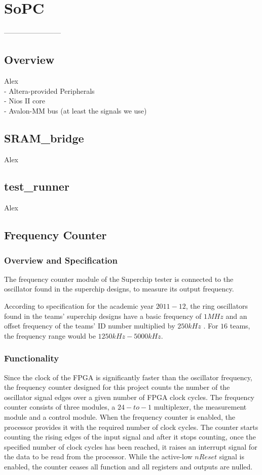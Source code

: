 \chapter{SoPC}
------------------------

\section{Overview}
Alex \\
   - Altera-provided Peripherals \\
   - Nios II core \\
   - Avalon-MM bus (at least the signals we use)

\section{SRAM\_bridge}
Alex

\section{test\_runner}
Alex \\


\section{Frequency Counter}

\subsection{Overview and Specification}

The frequency counter module of the Superchip tester is connected to the oscillator found in the superchip designs, to measure its output frequency.

According to specification for the academic year $2011-12$, the ring oscillators found in the teams' superchip designs have a basic frequency of $1MHz$ and an offset frequency of the teams' ID number multiplied by $250kHz$ \citep{Southampton:2011:spec}. For $16$ teams, the frequency range would be $1250kHz - 5000kHz$.

\subsection{Functionality}

Since the clock of the FPGA is significantly faster than the oscillator frequency, the frequency counter designed for this project counts the number of the oscillator signal edges over a given number of FPGA clock cycles. The frequency counter consists of three modules, a $24-to-1$ multiplexer, the measurement module and a control module. When the frequency counter is enabled, the processor provides it with the required number of clock cycles. The counter starts counting the rising edges of the input signal and after it stops counting, once the specified number of clock cycles has been reached, it raises an interrupt signal for the data to be read from the processor. While the active-low $nReset$ signal is enabled, the counter ceases all function and all registers and outputs are nulled.

